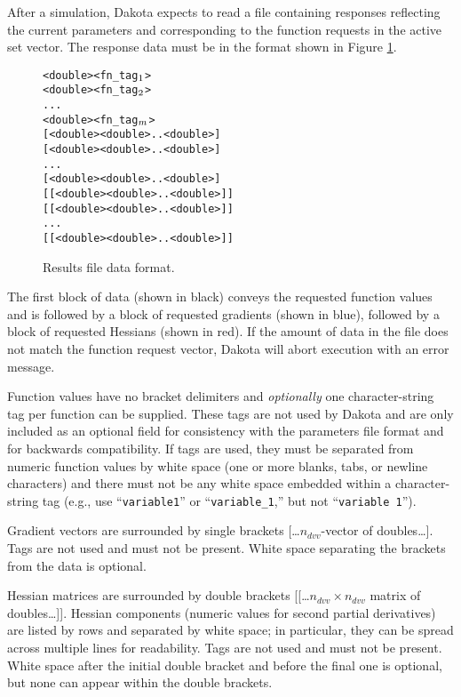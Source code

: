 After a simulation, Dakota expects to read a file
containing responses reflecting the current parameters and
corresponding to the function requests in the active
set vector. The response data must be in the format
shown in Figure \ref{responses:figure01}.

\begin{figure}
  \centering
  \begin{bigbox}
  \begin{alltt}
    <double> <fn_tag\(\sb{1}\)>
    <double> <fn_tag\(\sb{2}\)>
    ...
    <double> <fn_tag\(\sb{m}\)> \color{blue}
    [ <double> <double> .. <double> ]
    [ <double> <double> .. <double> ]
    ...
    [ <double> <double> .. <double> ] \color{red}
    [[ <double> <double> .. <double> ]]
    [[ <double> <double> .. <double> ]]
    ...
    [[ <double> <double> .. <double> ]]
  \end{alltt}
  \end{bigbox}
  \caption{Results file data format.}
  \label{responses:figure01}
\end{figure}

The first block of data (shown in black) conveys the requested function values
and is followed by a block of requested gradients
(shown in blue), followed by a block of requested Hessians (shown
in red). If the amount of data in the file does not match the function
request vector, Dakota will abort execution with an error message.

Function values have no bracket delimiters and \emph{optionally} one
character-string tag per function can be supplied.  These tags are not
used by
Dakota and are only included as an optional field for consistency with
the parameters file format and for backwards compatibility.  If
tags are used, they must be separated from
numeric function values by white space (one or more blanks, tabs, or newline
characters) and there must not
be any white space embedded within a character-string tag (e.g., use
``\texttt{variable1}'' or ``\texttt{variable\_1},'' but not
``\texttt{variable 1}'').

Gradient vectors are surrounded by single brackets
[\ldots$n_{dvv}$-vector of doubles\ldots]. Tags are not used and must
not be present. White space separating the brackets from the data is
optional.

Hessian matrices are surrounded by double brackets
[[\ldots$n_{dvv} \times n_{dvv}$ matrix of doubles\ldots]].  Hessian
components (numeric values for second partial derivatives) are
listed by rows and separated by white space; in particular, they
can be spread across multiple
lines for readability.  Tags are not used and must not be present.
White space after the initial double bracket and before the final one
is optional, but none can appear within the double brackets.

